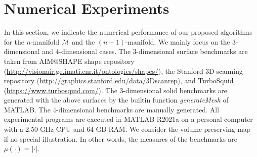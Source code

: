 \documentclass{article}
\begin{document}
\section{Numerical Experiments}

In this section, we indicate the numerical performance of our proposed algorithms for the $n$-manifold $\mathcal{M}$ and the $(n-1)$-manifold. We mainly focus on the $3$-dimensional and $4$-dimensional cases. The $3$-dimensional surface benchmarks are taken from AIM@SHAPE shape repository (\url{http://visionair.ge.imati.cnr.it/ontologies/shapes/}),
the Stanford 3D scanning repository (\url{http://graphics.stanford.edu/data/3Dscanrep}),
and TurboSquid (\url{https://www.turbosquid.com/}). The $3$-dimensional solid benchmarks are generated with the above surfaces by the builtin function \emph{generateMesh} of MATLAB.
The $4$-dimensional benchmarks are manually generated. All experimental programs are executed in MATLAB R2021a on a personal computer with a 2.50 GHz CPU and 64 GB RAM. We consider the volume-preserving map if no special illustration. In other words, the measures of the benchmarks are $\mu(\cdot) = |\cdot|$.
\end{document}
